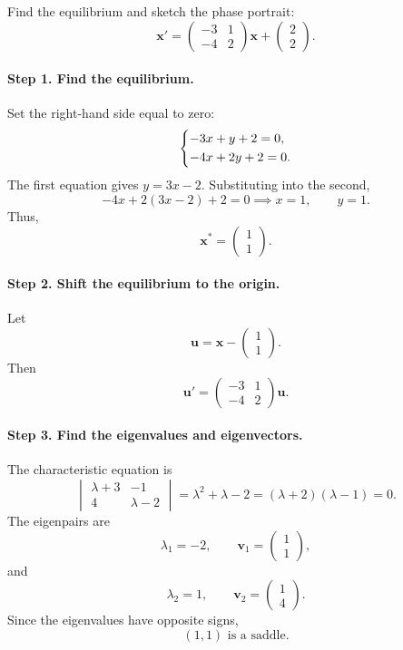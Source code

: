 \documentclass[10pt,letterpaper]{article}
\begin{document}
\begin{example}[4]{
Find the equilibrium and sketch the phase portrait:
\[
\mathbf{x}'=
\begin{pmatrix}
-3&1\\
-4&2
\end{pmatrix}\mathbf{x}
+
\begin{pmatrix}2\\2\end{pmatrix}.
\]
}

\paragraph{Step 1. Find the equilibrium.}
Set the right-hand side equal to zero:
\[
\begin{dcases}
-3x+y+2=0,\\
-4x+2y+2=0.
\end{dcases}
\]
The first equation gives $y=3x-2$. Substituting
into the second,
\[
-4x+2(3x-2)+2=0
\implies x=1,\qquad y=1.
\]
Thus,
\[
\boxed{
\mathbf{x}^*=\begin{pmatrix}1\\1\end{pmatrix}.
}
\]

\paragraph{Step 2. Shift the equilibrium to the origin.}
Let
\[
\mathbf{u}=
\mathbf{x}-\begin{pmatrix}1\\1\end{pmatrix}.
\]
Then
\[
\mathbf{u}'=
\begin{pmatrix}
-3&1\\
-4&2
\end{pmatrix}\mathbf{u}.
\]

\paragraph{Step 3. Find the eigenvalues and eigenvectors.}
The characteristic equation is
\[
\begin{vmatrix}
\lambda+3&-1\\
4&\lambda-2
\end{vmatrix}
=\lambda^2+\lambda-2
=(\lambda+2)(\lambda-1)=0.
\]
The eigenpairs are
\[
\lambda_1=-2,\qquad
\mathbf{v}_1=\begin{pmatrix}1\\1\end{pmatrix},
\]
and
\[
\lambda_2=1,\qquad
\mathbf{v}_2=\begin{pmatrix}1\\4\end{pmatrix}.
\]
Since the eigenvalues have opposite signs,
\[
\boxed{(1,1)\text{ is a saddle}.}
\]


\end{example}
\end{document}
